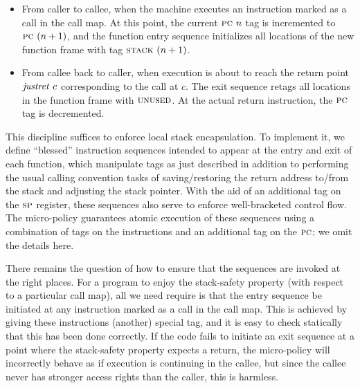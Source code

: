 \documentclass[acmsmall,review,anonymous]{acmart}\settopmatter{printfolios=true,printccs=false,printacmref=false}
\begin{document}
\begin{itemize}

\item From caller to callee, when the machine executes an instruction marked as a call in
  the call map.
  At this point, the current
  $\textsc{pc} ~ n$ tag is incremented to $\textsc{pc} ~ (n + 1)$, and the function
  entry sequence initializes  all locations of the new function frame with
  tag $\textsc{stack} ~ (n + 1)$.

\item From callee back to caller, when execution is about to reach the return point
  $\mathit{justret}\ c$
  corresponding to the call at $c$.  The exit sequence retags all locations in the function
  frame with $\textsc{unused}$. At the actual return instruction, the
  $\textsc{pc}$ tag is decremented.

\end{itemize}

This discipline suffices to enforce local stack encapsulation.
To implement it,  we define ``blessed'' instruction sequences
intended to appear at the entry and exit of each function,
which manipulate tags as just described in addition to performing the
usual calling convention tasks of saving/restoring the return address to/from
the stack and adjusting the stack pointer. With the aid of an additional tag on
the $\textsc{sp}$ register, these sequences also serve to enforce
well-bracketed control flow.
The micro-policy guarantees atomic execution of these sequences
using a combination of tags on the instructions
and an additional tag on the $\textsc{pc}$; we omit the details here.

There remains the question of how to ensure that the sequences are
invoked at the right places. For a program to enjoy the stack-safety property
(with respect to a particular call map), all we need require is that
the entry sequence be initiated at any instruction marked as a call
in the call map. This is achieved by giving these instructions (another) special tag,
and it is easy to check statically that this has been done correctly.
If the code fails to initiate an exit
sequence at a point where the stack-safety property expects a return,
the micro-policy will incorrectly behave as if execution
is continuing in the callee, but since the callee never has stronger access
rights than the caller, this is harmless.
\end{document}
